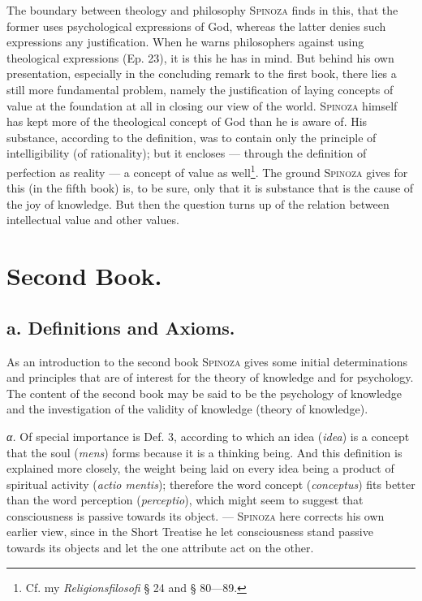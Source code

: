 \documentclass[12pt]{article}
\newcommand{\opage}[1]{\marginnote{\footnotesize\textit{[#1]}}}
\begin{document}
The boundary between theology and philosophy \textsc{Spinoza} finds in this, that the
former uses psycho\opage{35}logical expressions of God, whereas the latter denies such
expressions any justification. When he warns philosophers against using theological
expressions (Ep. 23), it is this he has in mind. But behind his own presentation,
especially in the concluding remark to the first book, there lies a still more fundamental
problem, namely the justification of laying concepts of value at the foundation at all in
closing our view of the world. \textsc{Spinoza} himself has kept more of the theological
concept of God than he is aware of. His substance, according to the definition, was to
contain only the principle of intelligibility (of rationality); but it encloses ---
through the definition of perfection as reality --- a concept of value as
well\footnote{Cf. my \textit{Religionsfilosofi} § 24 and § 80---89.}. The ground
\textsc{Spinoza} gives for this (in the fifth book) is, to be sure, only that it is
substance that is the cause of the joy of knowledge. But then the question turns up of the
relation between intellectual value and other values.

\opage{36}\section*{Second Book.}
\subsection*{a. Definitions and Axioms.}

As an introduction to the second book \textsc{Spinoza} gives some initial determinations
and principles that are of interest for the theory of knowledge and for psychology. The
content of the second book may be said to be the psychology of knowledge and the
investigation of the validity of knowledge (theory of knowledge).

\textit{α.} Of special importance is Def. 3, according to which an idea (\textit{idea}) is
a concept that the soul (\textit{mens}) forms because it is a thinking being. And this
definition is explained more closely, the weight being laid on every idea being a product
of spiritual activity (\textit{actio mentis}); therefore the word concept
(\textit{conceptus}) fits better than the word perception (\textit{perceptio}), which might
seem to suggest that consciousness is passive towards its object. --- \textsc{Spinoza} here
corrects his own earlier view, since in the Short Treatise he let consciousness stand
passive towards its objects and let the one attribute act on the other.
\end{document}
